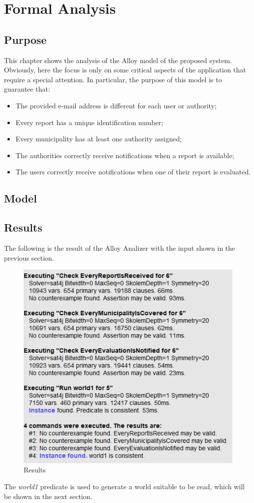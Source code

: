 \documentclass[12pt,a4paper]{report}
\begin{document}
\chapter{Formal Analysis}
	\section{Purpose}
This chapter shows the analysis of the Alloy model of the proposed system. Obviously, here the focus is only on some critical aspects of the application that require a special attention. In particular, the purpose of this model is to guarantee that:
\begin{itemize}
	\item The provided e-mail address is different for each user or authority;
	\item Every report has a unique identification number;
	\item Every municipality has at least one authority assigned;
	\item The authorities correctly receive notifications when a report is available;
	\item The users correctly receive notifications when one of their report is evaluated.
\end{itemize}

\newpage
	\section{Model}

	

	\newpage

	\section{Results}
	The following is the result of the Alloy Analizer with the input shown in the previous section. 
		\begin{figure}[H]
				\includegraphics[scale = 0.9, center]{Consistency}
				\caption{Results}
		\end{figure}
	The \emph{world1} predicate is used to generate a world suitable to be read, which will be shown in the next section.
	
\end{document}
